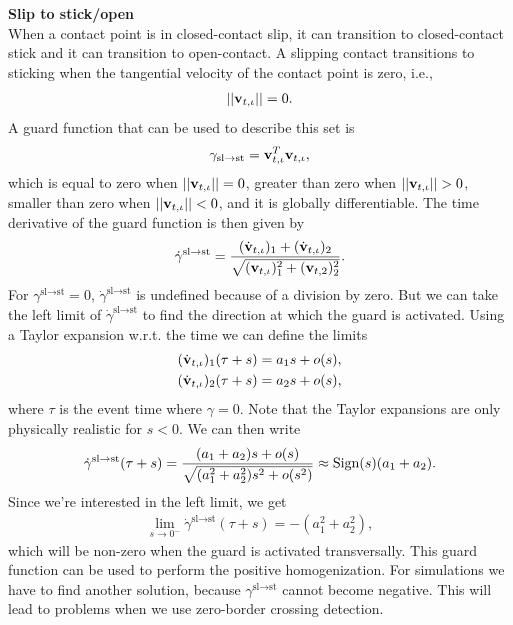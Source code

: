 \documentclass[../DC2017114Bouma.tex]{subfiles}
\begin{document}
\textbf{Slip to stick/open}\\
When a contact point is in closed-contact slip, it can transition to closed-contact stick and it can transition to open-contact. A slipping contact transitions to sticking when the tangential velocity of the contact point is zero, i.e.,
\begin{align}
||\mathbf{v}_{t,\iota}|| = 0.
\end{align}
A guard function that can be used to describe this set is
\begin{align}
\gamma_{\text{sl}\rightarrow\text{st}} = \mathbf{v}_{t,\iota}^T\mathbf{v}_{t,\iota},
\end{align}
which is equal to zero when $||\mathbf{v}_{t,\iota}|| = 0$, greater than zero when $||\mathbf{v}_{t,\iota}|| > 0$, smaller than zero when $||\mathbf{v}_{t,\iota}|| < 0$, and it is globally differentiable. The time derivative of the guard function is then given by
\begin{align}
\dot{\gamma}^{\text{sl}\rightarrow\text{st}} = \frac{(\dot{\mathbf{v}}_{t,\iota})_1 + (\dot{\mathbf{v}}_{t,\iota})_2}{\sqrt{(\mathbf{v}_{t,\iota})_1^2 + (\mathbf{v}_{t,2})_2^2}}.
\end{align}
For $\gamma^{\text{sl}\rightarrow\text{st}} = 0$, $\dot{\gamma}^{\text{sl}\rightarrow\text{st}}$ is undefined because of a division by zero. But we can take the left limit of $\dot{\gamma}^{\text{sl}\rightarrow\text{st}}$ to find the direction at which the guard is activated. Using a Taylor expansion w.r.t. the time we can define the limits
\begin{align}
(\dot{\mathbf{v}}_{t,\iota})_1(\tau + s) = a_1 s + o(s),\\
(\dot{\mathbf{v}}_{t,\iota})_2(\tau + s) = a_2 s + o(s),
\end{align}
where $\tau$ is the event time where $\gamma = 0$. Note that the Taylor expansions are only physically realistic for $s < 0$. We can then write
\begin{align}
\dot{\gamma}^{\text{sl}\rightarrow\text{st}}(\tau+s) = \frac{(a_1 + a_2)s + o(s)}{\sqrt{(a_1^2 + a_2^2)s^2 + o(s^2)}} \approx \operatorname{\textnormal{Sign}}(s)(a_1 + a_2).
\end{align}
Since we're interested in the left limit, we get
\begin{align}
\lim\limits_{s\rightarrow 0^-}\dot{\gamma}^{\text{sl}\rightarrow\text{st}}(\tau+s) = -(a^2_1 + a^2_2),
\end{align}
which will be non-zero when the guard is activated transversally. This guard function can be used to perform the positive homogenization. For simulations we have to find another solution, because $\gamma^{\text{sl}\rightarrow\text{st}}$ cannot become negative. This will lead to problems when we use zero-border crossing detection.
\end{document}
